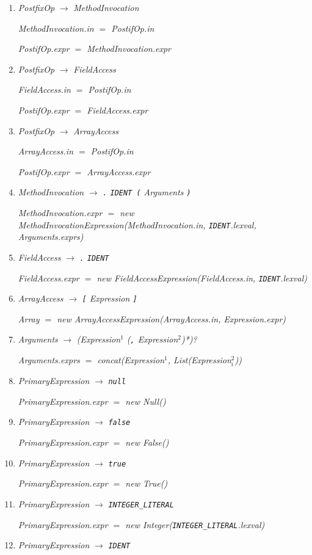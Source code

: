 \documentclass[12pt,a4paper]{scrartcl}
\renewcommand{\prod}[2]{\textit{#1} $\rightarrow$ \textit{#2}}
\newcommand{\tok}[1]{\textnormal{\texttt{#1}}}
\newcommand{\assign}[2]{\textit{#1} $=$ #2}
\newcommand{\List}[1]{\textnormal{List(\textit{#1})}}
\newcommand{\concat}[1]{\textnormal{concat(\textit{#1})}}
\newcommand{\new}[2]{\textnormal{new #1(\textit{#2})}}
\newcommand{\attr}[1]{\parbox{\linewidth}{\raggedleft \textit{#1}}}
\begin{document}
\begin{enumerate}
    \item \prod{PostfixOp}{MethodInvocation}\\
        \attr{\assign{MethodInvocation.in}{PostifOp.in}}
        \attr{\assign{PostifOp.expr}{MethodInvocation.expr}}
    \item \prod{PostfixOp}{FieldAccess}\\
        \attr{\assign{FieldAccess.in}{PostifOp.in}}
        \attr{\assign{PostifOp.expr}{FieldAccess.expr}}
    \item \prod{PostfixOp}{ArrayAccess}\\
        \attr{\assign{ArrayAccess.in}{PostifOp.in}}
        \attr{\assign{PostifOp.expr}{ArrayAccess.expr}}
    \item \prod{MethodInvocation}{\tok{.} \tok{IDENT (} Arguments \tok{)}}\\
        \attr{\assign{MethodInvocation.expr}{\new{MethodInvocationExpression}{MethodInvocation.in, \tok{IDENT}.lexval, Arguments.exprs}}}
    \item \prod{FieldAccess}{\tok{.} \tok{IDENT}}\\
        \attr{\assign{FieldAccess.expr}{\new{FieldAccessExpression}{FieldAccess.in, \tok{IDENT}.lexval}}}
    \item \prod{ArrayAccess}{\tok{[} Expression \tok{]}}\\
        \attr{\assign{Array}{\new{ArrayAccessExpression}{ArrayAccess.in, Expression.expr}}}
    \item \prod{Arguments}{(Expression$^1$ (\tok{,} Expression$^2$)*)?}\\
        \attr{\assign{Arguments.exprs}{\concat{Expression$^1$, \List{Expression$^2_i$}}}}
    \item \prod{PrimaryExpression}{\tok{null}}\\
        \attr{\assign{PrimaryExpression.expr}{\new{Null}{}}}
    \item \prod{PrimaryExpression}{\tok{false}}\\
        \attr{\assign{PrimaryExpression.expr}{\new{False}{}}}
    \item \prod{PrimaryExpression}{\tok{true}}\\
        \attr{\assign{PrimaryExpression.expr}{\new{True}{}}}
    \item \prod{PrimaryExpression}{\tok{INTEGER\_LITERAL}}\\
        \attr{\assign{PrimaryExpression.expr}{\new{Integer}{\tok{INTEGER\_LITERAL}.lexval}}}
    \item \prod{PrimaryExpression}{\tok{IDENT}}\\

\end{enumerate}
\end{document}
